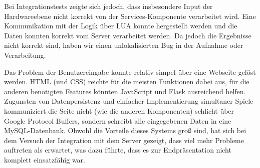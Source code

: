  Bei Integrationstests zeigte sich jedoch, dass insbesondere Input der Hardwareebene nicht korrekt von der Services-Komponente verarbeitet wird. 
 Eine Kommunikation mit der Logik über LUA konnte hergestellt werden und die Daten konnten korrekt vom Server verarbeitet werden. 
 Da jedoch die Ergebnisse nicht korrekt sind, haben wir einen unlokalisierten Bug in der Aufnahme oder Verarbeitung.
 
Das Problem der Benutzereingabe konnte relativ simpel über eine Webseite gelöst werden. HTML (und CSS) reichte für die 
meisten Funktionen dabei aus, für die anderen benötigten Features könnten JavaScript und Flask ausreichend helfen. 
Zugunsten von Datenpersistenz und einfacher Implementierung simultaner Spiele kommuniziert die Seite nicht (wie die anderen Komponenten) 
schlicht über Google Protocol Buffers, sondern schreibt alle eingegebenen Daten in eine MySQL-Datenbank. Obwohl die Vorteile dieses Systems 
groß sind, hat sich bei dem Versuch der Integration mit dem Server gezeigt, dass viel mehr Probleme auftreten als erwartet, was dazu führte, 
dass es zur Endpräsentation nicht komplett einsatzfähig war.


